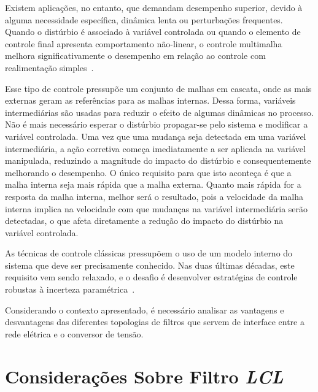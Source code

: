 	Existem aplicações, no entanto, que demandam desempenho superior, devido à alguma necessidade específica, dinâmica lenta ou perturbações frequentes. Quando o distúrbio é associado à variável controlada ou quando o elemento de controle final apresenta comportamento não-linear, o controle multimalha melhora significativamente o desempenho em relação ao controle com realimentação simples~\cite{ref:KRISHNA}.

	Esse tipo de controle pressupõe um conjunto de malhas em cascata, onde as mais externas geram as referências para as malhas internas. Dessa forma, variáveis intermediárias são usadas para reduzir o efeito de algumas dinâmicas no processo. Não é mais necessário esperar o distúrbio propagar-se pelo sistema e modificar a variável controlada. Uma vez que uma mudança seja detectada em uma variável intermediária, a ação corretiva começa imediatamente a ser aplicada na variável manipulada, reduzindo a magnitude do impacto do distúrbio e consequentemente melhorando o desempenho. O único requisito para que isto aconteça é que a malha interna seja mais rápida que a malha externa. Quanto mais rápida for a resposta da malha interna, melhor será o resultado, pois a velocidade da malha interna implica na velocidade com que mudanças na variável intermediária serão detectadas, o que afeta diretamente a redução do impacto do distúrbio na variável controlada.

	As técnicas de controle clássicas pressupõem o uso de um modelo interno do sistema que deve ser precisamente conhecido. Nas duas últimas décadas, este requisito vem sendo relaxado, e o desafio é desenvolver estratégias de controle robustas à incerteza paramétrica~\cite{ref:GEROMEL}.


  Considerando o contexto apresentado, é necessário analisar as vantagens e desvantagens das diferentes topologias de filtros que servem de interface entre a rede elétrica e o conversor de tensão. 

\section{Considerações Sobre Filtro \emph{LCL}}

